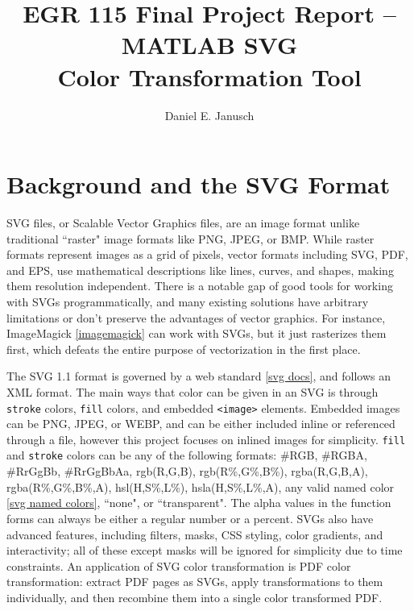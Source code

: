 \documentclass[12pt]{article}
\newcommand \iindent  {\indent \indent}
\newcommand \iiindent {\indent \iindent}
\begin{document}

\title{EGR 115 Final Project Report {\bf–} MATLAB SVG\\Color Transformation Tool}
\author{Daniel E. Janusch}
\maketitle

\section{Background and the SVG Format}

\iiindent SVG files, or Scalable Vector Graphics files, are an image format unlike
traditional ``raster" image formats like PNG, JPEG, or BMP. While raster formats
represent images as a grid of pixels, vector formats including SVG, PDF, and EPS,
use mathematical descriptions like lines, curves, and shapes, making them resolution
independent. There is a notable gap of good tools for working with SVGs
programmatically, and many existing solutions have arbitrary limitations or don't
preserve the advantages of vector graphics. For instance, ImageMagick \ref{imagemagick}
can work with SVGs, but it just rasterizes them first, which defeats the entire purpose
of vectorization in the first place.
\vspace{5px}

\iindent The SVG 1.1 format is governed by a web standard \ref{svg docs}, and
follows an XML format. The main ways that color can be given in an SVG is through
{\tt stroke} colors, {\tt fill} colors, and embedded {\tt <image>} elements.
Embedded images can be PNG, JPEG, or WEBP, and can be either included
inline or referenced through a file, however this project focuses on inlined
images for simplicity. \texttt{fill} and \texttt{stroke} colors can be any of
the following formats: \#RGB, \#RGBA, \#RrGgBb, \#RrGgBbAa, rgb(R,G,B),
rgb(R\%,G\%,B\%), rgba(R,G,B,A), rgba(R\%,G\%,B\%,A), hsl(H,S\%,L\%),
hsla(H,S\%,L\%,A), any valid named color \ref{svg named colors}, ``none", or
``transparent". The alpha values in the function forms can always be either a
regular number or a percent. SVGs also have advanced features, including filters,
masks, CSS styling, color gradients, and interactivity; all of these except masks
will be ignored for simplicity due to time constraints. An application of SVG
color transformation is PDF color transformation: extract PDF pages as SVGs, apply
transformations to them individually, and then recombine them into a single
color transformed PDF.
\vspace{-15px}
\end{document}
